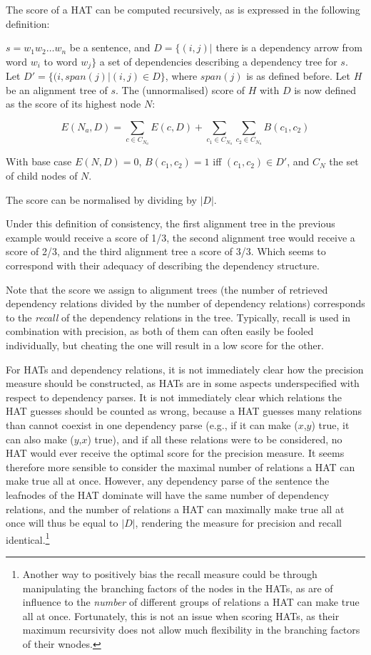 The score of a HAT can be computed recursively, as is expressed in the following definition:

\begin{definition}
 $s = w_1 w_2 \dots w_n$ be a sentence, and $D = \{ (i,j) |$ there is a dependency arrow from word $w_i$ to word $w_j \}$ a set of dependencies describing a dependency tree for $s$. Let $D' = \{(i,span(j) | (i,j)\in D\}$, where $span(j)$ is as defined before. Let $H$ be an alignment tree of $s$. The (unnormalised) score of $H$ with $D$ is now defined as the score of its highest node $N$:

$$
E(N_a,D) = \sum_{c\in C_{N_a}} E(c,D)+ \sum_{c_1\in C_{N_a}} \sum_{c_2\in C_{N_a}} B(c_1,c_2)
$$

\noindent With base case $E(N,D) = 0$, $B(c_1,c_2) = 1$ iff  $(c_1,c_2)\in D'$, and $C_N$ the set of child nodes of $N$.

The score can be normalised by dividing by $|D|$.
\end{definition}

Under this definition of consistency, the first alignment tree in the previous example would receive a score of 1/3, the second alignment tree would receive a score of 2/3, and the third alignment tree a score of 3/3. Which seems to correspond with their adequacy of describing the dependency structure.

Note that the score we assign to alignment trees (the number of retrieved dependency relations divided by the number of dependency relations) corresponds to the \textit{recall} of the dependency relations in the tree. Typically, recall is used in combination with precision, as both of them can often easily be fooled individually, but cheating the one will result in a low score for the other.

For HATs and dependency relations, it is not immediately clear how the precision measure should be constructed, as HATs are in some aspects underspecified with respect to dependency parses. It is not immediately clear which relations the HAT guesses should be counted as wrong, because a HAT guesses many relations than cannot coexist in one dependency parse (e.g., if it can make ($x$,$y$) true, it can also make ($y$,$x$) true), and if all these relations were to be considered, no HAT would ever receive the optimal score for the precision measure. It seems therefore more sensible to consider the maximal number of relations a HAT can make true all at once. However, any dependency parse of the sentence the leafnodes of the HAT dominate will have the same number of dependency relations, and the number of relations a HAT can maximally make true all at once will thus be equal to $|D|$, rendering the measure for precision and recall identical.\footnote{Another way to positively bias the recall measure could be through manipulating the branching factors of the nodes in the HATs, as are of influence to the \textit{number} of different groups of relations a HAT can make true all at once. Fortunately, this is not an issue when scoring HATs, as their maximum recursivity does not allow much flexibility in the branching factors of their wnodes.}


